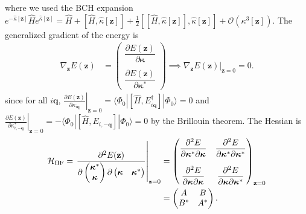 where we used the BCH expansion $e^{-\hat\kappa[\mathbf z]}\hat H e^{\hat\kappa[\mathbf z]} = \hat H + [\hat H,\hat\kappa[\mathbf z]] + \frac{1}{2}[[\hat H,\hat\kappa[\mathbf z]],\hat\kappa[\mathbf z]] + \mathcal O(\kappa^3[\mathbf z])$. The generalized gradient of the energy is
\begin{align}
    \nabla_{\mathbf z}E(\mathbf z)
    &=
    \begin{pmatrix}
        \dfrac{\partial E(\mathbf z)}
        {\partial\boldsymbol{\kappa}}\\
        \\
        \dfrac{\partial E(\mathbf z)}
        {\partial\boldsymbol{\kappa}^{*}}
    \end{pmatrix} \implies    \left.
    \nabla_{\mathbf z}E(\mathbf z)
    \right|_{\mathbf z=0}
    =
    0.
\end{align}
since for all $i\mathbf q$, $
    \left.
    \frac{\partial E(\mathbf z)}
    {\partial\kappa_{i\mathbf q}}
    \right|_{\mathbf z=0}
    =
    \langle\Phi_0|
    [\hat H,E_{i\mathbf q}^{\dagger}]
    |\Phi_0\rangle=0
$ and $
    \left.
    \frac{\partial E(\mathbf z)}
    {\partial\kappa_{i,-\mathbf q}^{*}}
    \right|_{\mathbf z=0}
    =
    -
    \langle\Phi_0|
    [\hat H,E_{i,-\mathbf q}]
    |\Phi_0\rangle=0$ by the Brillouin theorem.
The Hessian is
\begin{align}
    \mathcal H_{\rm HF}
    =
    \left.
    \frac{\partial^2 E(\mathbf z)}
    {\partial
    \begin{pmatrix}
        \boldsymbol{\kappa}^{*}\\
        \boldsymbol{\kappa}
    \end{pmatrix}
    \partial
    \begin{pmatrix}
        \boldsymbol{\kappa}&
        \boldsymbol{\kappa}^{*}
    \end{pmatrix}}
    \right|_{\mathbf z=0}&=
    \begin{pmatrix}
        \displaystyle
        \frac{\partial^2E}
        {\partial\boldsymbol{\kappa}^{*}
         \partial\boldsymbol{\kappa}}
        &
        \displaystyle
        \frac{\partial^2E}
        {\partial\boldsymbol{\kappa}^{*}
         \partial\boldsymbol{\kappa}^{*}}
        \\[5mm]
        \displaystyle
        \frac{\partial^2E}
        {\partial\boldsymbol{\kappa}
         \partial\boldsymbol{\kappa}}
        &
        \displaystyle
        \frac{\partial^2E}
        {\partial\boldsymbol{\kappa}
         \partial\boldsymbol{\kappa}^{*}}
    \end{pmatrix}_{\mathbf z=0}
    \\
    &={
    \begin{pmatrix}
        A & B\\
        B^{*} & A^{*}
    \end{pmatrix}.
    }
\end{align}
